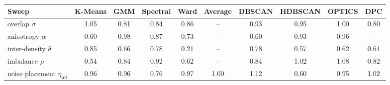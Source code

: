 \begin{tabular}{@{}lccccccccc@{}}
\toprule
Sweep & K-Means & GMM & Spectral & Ward & Average & DBSCAN & HDBSCAN & OPTICS & DPC \\
\midrule
overlap $\sigma$ & 1.05 & 0.81 & 0.84 & 0.86 & -- & 0.93 & 0.95 & 1.00 & 0.80 \\
anisotropy $\alpha$ & 0.60 & 0.98 & 0.87 & 0.73 & -- & 0.60 & 0.93 & 0.96 & -- \\
inter-density $\delta$ & 0.85 & 0.66 & 0.78 & 0.21 & -- & 0.78 & 0.57 & 0.62 & 0.64 \\
imbalance $\rho$ & 0.54 & 0.84 & 0.92 & 0.62 & -- & 0.84 & 1.02 & 1.08 & 0.82 \\
noise placement $\eta_{\text{int}}$ & 0.96 & 0.96 & 0.76 & 0.97 & 1.00 & 1.12 & 0.60 & 0.95 & 1.02 \\
\bottomrule
\end{tabular}
